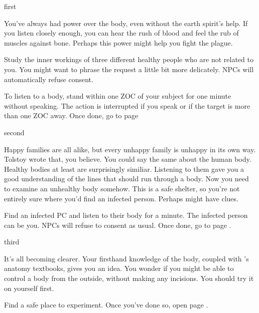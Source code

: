 \documentclass[greennotebook]{Pestilence} %
\begin{document}
\startnotebook{\nRebelLab{}}

\begin{page}{first}

You've always had power over the body, even without the earth spirit's help. If you listen closely enough, you can hear the rush of blood and feel the rub of muscles against bone. Perhaps this power might help you fight the plague. 

Study the inner workings of three different healthy people who are not related to you. You might want to phrase the request a little bit more delicately. NPCs will automatically refuse consent. 

To listen to a body, stand within one ZOC of your subject for one minute without speaking. The action is interrupted if you speak or if the target is more than one ZOC away. Once done, go to page 

\end{page}

\begin{page}{second}

Happy families are all alike, but every unhappy family is unhappy in its own way. Tolstoy wrote that, you believe. You could say the same about the human body. Healthy bodies at least are surprisingly similiar. Listening to them gave you a good understanding of the lines that should run through a body. Now you need to examine an unhealthy body somehow. This is a safe shelter, so you're not entirely sure where you'd find an infected person. Perhaps \cOutsider{} might have clues.

Find an infected PC and listen to their body for a minute. The infected person can be you. NPCs will refuse to consent as usual. Once done, go to page .

\end{page}

\begin{page}{third}

It's all becoming clearer. Your firsthand knowledge of the body, coupled with \cOutsider{}'s anatomy textbooks, gives you an idea. You wonder if you might be able to control a body from the outside, without making any incisions. You should try it on yourself first.

Find a safe place to experiment. Once you've done so, open page .

\end{page}
\end{document}
